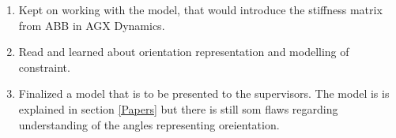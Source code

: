 \begin{enumerate}
    \item Kept on working with the model, that would introduce the stiffness matrix
    from ABB in AGX Dynamics.
    \item Read and learned about orientation representation and modelling of constraint.
    \item Finalized a model that is to be presented to the supervisors. The model is
    is explained in section \ref{Papers} but there is still som flaws regarding understanding of the
    angles representing oreientation.

\end{enumerate}